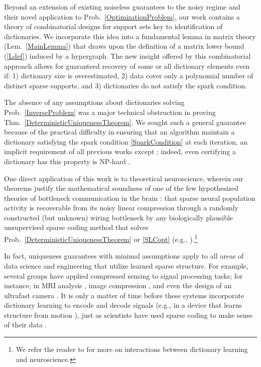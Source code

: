 Beyond an extension of existing noiseless guarantees \cite{Hillar15} to the noisy regime and their novel application to Prob.~\ref{OptimizationProblem}, our work contains a theory of combinatorial designs for support sets key to identification of dictionaries. We incorporate this idea into a fundamental lemma in matrix theory (Lem.~\ref{MainLemma}) that draws upon the definition of a matrix lower bound (\ref{Ldef}) induced by a hypergraph. The new insight offered by this combinatorial approach allows for guaranteed recovery of some or all dictionary elements even if: 1) dictionary size is overestimated, 2) data cover only a polynomial number of distinct sparse supports, and 3) dictionaries do not satisfy the spark condition. 

The absence of any assumptions about dictionaries solving Prob.~\ref{InverseProblem} was a major technical obstruction in proving Thm.~\ref{DeterministicUniquenessTheorem}. We sought such a general guarantee because of the practical difficulty in ensuring that an algorithm maintain a dictionary satisfying the spark condition \eqref{SparkCondition} at each iteration, an implicit requirement of all previous works except \cite{Hillar15}; indeed, even certifying a dictionary has this property is NP-hard \cite{tillmann2014computational}.

One direct application of this work is to theoretical neuroscience, wherein our theorems justify the mathematical soundness of one of the few hypothesized theories of bottleneck communication in the brain \cite{Isely10}: that sparse neural population activity is recoverable from its noisy linear compression through a randomly constructed (but unknown) wiring bottleneck by any biologically plausible unsupervised sparse coding method that solves Prob.~\ref{DeterministicUniquenessTheorem} or \ref{SLCopt} (e.g., \cite{rehnsommer2007, rozell2007neurally, pehlevan2015normative}).\footnote{We refer the reader to \cite{ganguli2012compressed} for more on interactions between dictionary learning and neuroscience.}

In fact, uniqueness guarantees with minimal assumptions apply to all areas of data science and engineering that utilize learned sparse structure. For example, several groups have applied compressed sensing to signal processing tasks; for instance, in MRI analysis \cite{lustig2008compressed}, image compression \cite{Duarte08}, and even the design of an ultrafast camera \cite{Gao14}. It is only a matter of time before these systems incorporate dictionary learning to encode and decode signals (e.g., in a device that learns structure from motion \cite{kong2016prior}), just as scientists have used sparse coding to make sense of their data \cite{jung2001imaging, agarwal2014spatially, lee2016sparse, wu2016stability}. 

